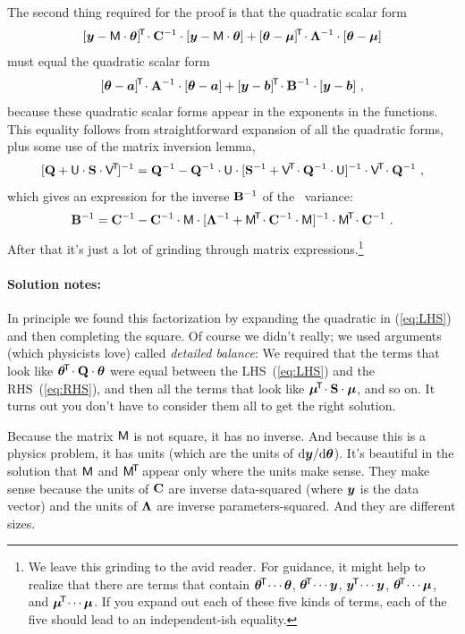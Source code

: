 The second thing required for the proof is that the quadratic scalar form
\begin{equation}\label{eq:LHS}
[\boldsymbol{y}-\mathsf{M}\cdot\boldsymbol{\theta}]^{\!\mathsf{T}\!}\cdot\mathbf{C}^{-1}\cdot[\boldsymbol{y}-\mathsf{M}\cdot\boldsymbol{\theta}]
+ [\boldsymbol{\theta}-\boldsymbol{\mu}]^{\!\mathsf{T}\!}\cdot\mathbf{\Lambda}^{-1}\cdot[\boldsymbol{\theta}-\boldsymbol{\mu}]
\end{equation}
must equal the quadratic scalar form
\begin{equation}\label{eq:RHS}
[\boldsymbol{\theta}-\boldsymbol{a}]^{\!\mathsf{T}\!}\cdot\mathbf{A}^{-1}\cdot[\boldsymbol{\theta}-\boldsymbol{a}]
+ [\boldsymbol{y}-\boldsymbol{b}]^{\!\mathsf{T}\!}\cdot\mathbf{B}^{-1}\cdot[\boldsymbol{y}-\boldsymbol{b}]
~,
\end{equation}
because these quadratic scalar forms appear in the exponents in the functions.
This equality follows from straightforward expansion of
all the quadratic forms, plus some use of the matrix inversion lemma,
\begin{equation}\label{eq:invlemma}
[\mathbf{Q} + \mathsf{U}\cdot\mathbf{S}\cdot\mathsf{V}^{\!\mathsf{T}\!}]^{-1} = \mathbf{Q}^{-1} - \mathbf{Q}^{-1}\cdot\mathsf{U}\cdot[\mathbf{S}^{-1} + \mathsf{V}^{\!\mathsf{T}\!}\cdot\mathbf{Q}^{-1}\cdot\mathsf{U}]^{-1}\cdot\mathsf{V}^{\!\mathsf{T}\!}\cdot\mathbf{Q}^{-1}
~ ,
\end{equation}
which gives an expression for the inverse $\mathbf{B}^{-1}$ of the \FML\ variance:
\begin{equation}
\mathbf{B}^{-1} = \mathbf{C}^{-1} - \mathbf{C}^{-1}\cdot\mathsf{M}\cdot[\mathbf{\Lambda}^{-1} + \mathsf{M}^{\!\mathsf{T}\!}\cdot\mathbf{C}^{-1}\cdot\mathsf{M}]^{-1}\cdot\mathsf{M}^{\!\mathsf{T}\!}\cdot\mathbf{C}^{-1}
~ .
\end{equation}
After that it's just a lot of grinding through matrix expressions.\footnote{%
We leave this grinding to the avid reader.
For guidance, it might help to realize that there are terms that
contain $\boldsymbol{\theta}^{\!\mathsf{T}\!}\cdots\boldsymbol{\theta}$, $\boldsymbol{\theta}^{\!\mathsf{T}\!}\cdots\boldsymbol{y}$, $\boldsymbol{y}^{\!\mathsf{T}\!}\cdots\boldsymbol{y}$,
$\boldsymbol{\theta}^{\!\mathsf{T}\!}\cdots\boldsymbol{\mu}$, and $\boldsymbol{\mu}^{\!\mathsf{T}\!}\cdots\boldsymbol{\mu}$.
If you expand out each of these five kinds of terms, each of the five
should lead to an independent-ish equality.}

\paragraph{Solution notes:}
In principle we found this factorization by expanding the quadratic in
(\ref{eq:LHS}) and then completing the square.
Of course we didn't really; we used arguments (which physicists love)
called \emph{detailed balance}:
We required that the terms that look like
$\boldsymbol{\theta}^{\!\mathsf{T}\!}\cdot\mathbf{Q}\cdot\boldsymbol{\theta}$ were equal between the LHS~(\ref{eq:LHS})
and the RHS~(\ref{eq:RHS}), and then all the terms that look like
$\boldsymbol{\mu}^{\!\mathsf{T}\!}\cdot\mathbf{S}\cdot\boldsymbol{\mu}$, and so on.
It turns out you don't have to consider them all to get the right solution.

Because the matrix $\mathsf{M}$ is not square, it has no inverse. And because this
is a physics problem, it has units (which are the units of $\mathrm{d}\boldsymbol{y}/\mathrm{d}\boldsymbol{\theta}$).
It's beautiful in the solution that $\mathsf{M}$ and $\mathsf{M}^{\!\mathsf{T}\!}$ appear only where the
units make sense.
They make sense because the units of $\mathbf{C}$ are inverse data-squared (where $\boldsymbol{y}$
is the data vector) and the units of $\mathbf{\Lambda}$ are inverse parameters-squared.
And they are different sizes.


